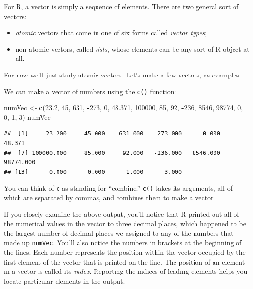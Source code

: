 \documentclass[]{book}
\makeatletter
\newenvironment{Shaded}{\begin{snugshade}}{\end{snugshade}}
\newcommand{\KeywordTok}[1]{\textcolor[rgb]{0.13,0.29,0.53}{\textbf{#1}}}
\newcommand{\DecValTok}[1]{\textcolor[rgb]{0.00,0.00,0.81}{#1}}
\newcommand{\FloatTok}[1]{\textcolor[rgb]{0.00,0.00,0.81}{#1}}
\newcommand{\StringTok}[1]{\textcolor[rgb]{0.31,0.60,0.02}{#1}}
\newcommand{\OperatorTok}[1]{\textcolor[rgb]{0.81,0.36,0.00}{\textbf{#1}}}
\newcommand{\NormalTok}[1]{#1}
\providecommand{\tightlist}{%
  \setlength{\itemsep}{0pt}\setlength{\parskip}{0pt}}
\newenvironment{kframe}{%
\medskip{}
\setlength{\fboxsep}{.8em}
 \def\at@end@of@kframe{}%
 \ifinner\ifhmode%
  \def\at@end@of@kframe{\end{minipage}}%
  \begin{minipage}{\columnwidth}%
 \fi\fi%
 \def\FrameCommand##1{\hskip\@totalleftmargin \hskip-\fboxsep
 \colorbox{shadecolor}{##1}\hskip-\fboxsep
     \hskip-\linewidth \hskip-\@totalleftmargin \hskip\columnwidth}%
 \MakeFramed {\advance\hsize-\width
   \@totalleftmargin\z@ \linewidth\hsize
   \@setminipage}}%
 {\par\unskip\endMakeFramed%
 \at@end@of@kframe}
\renewenvironment{Shaded}{\begin{kframe}}{\end{kframe}}
\theoremstyle{definition}
\theoremstyle{definition}
\theoremstyle{definition}
\theoremstyle{remark}
\makeatother
\begin{document}
For R, a vector is simply a sequence of elements. There are two general
sort of vectors:

\begin{itemize}
\tightlist
\item
  \emph{atomic} vectors that come in one of six forms called
  \emph{vector types};
\item
  non-atomic vectors, called \emph{lists}, whose elements can be any
  sort of R-object at all.
\end{itemize}

For now we'll just study atomic vectors. Let's make a few vectors, as
examples.

We can make a vector of numbers using the
\texttt{c()} function:

\begin{Shaded}
\begin{Highlighting}[]
\NormalTok{numVec <-}\StringTok{ }\KeywordTok{c}\NormalTok{(}\FloatTok{23.2}\NormalTok{, }\DecValTok{45}\NormalTok{, }\DecValTok{631}\NormalTok{, }\OperatorTok{-}\DecValTok{273}\NormalTok{, }\DecValTok{0}\NormalTok{, }\FloatTok{48.371}\NormalTok{, }\DecValTok{100000}\NormalTok{,}
            \DecValTok{85}\NormalTok{, }\DecValTok{92}\NormalTok{, }\OperatorTok{-}\DecValTok{236}\NormalTok{, }\DecValTok{8546}\NormalTok{, }\DecValTok{98774}\NormalTok{, }\DecValTok{0}\NormalTok{, }\DecValTok{0}\NormalTok{, }\DecValTok{1}\NormalTok{, }\DecValTok{3}\NormalTok{)}
\NormalTok{numVec}
\end{Highlighting}
\end{Shaded}

\begin{verbatim}
##  [1]     23.200     45.000    631.000   -273.000      0.000     48.371
##  [7] 100000.000     85.000     92.000   -236.000   8546.000  98774.000
## [13]      0.000      0.000      1.000      3.000
\end{verbatim}

You can think of \texttt{c} as standing for ``combine.'' \texttt{c()}
takes its arguments, all of which are separated by commas, and combines
them to make a vector.

If you closely examine the above output, you'll notice that R printed
out all of the numerical values in the vector to three decimal places,
which happened to be the largest number of decimal places we assigned to
any of the numbers that made up \texttt{numVec}. You'll also notice the
numbers in brackets at the beginning of the lines. Each number
represents the position within the vector occupied by the first element
of the vector that is printed on the line. The position of an element in
a vector is called its \emph{index}. Reporting the indices
of leading elements helps you locate particular elements in the output.
\end{document}
